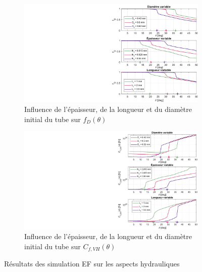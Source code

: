 \begin{figure}[!htbp]
	\begin{center}
		\begin{subfigure}[b]{0.49\textwidth}
			\captionsetup{justification=centering}
			\captionsetup{justification=centering}
			\includegraphics[trim={17cm 0cm 0cm 0cm},clip,width=\textwidth]{../Chap5/Figure/prospection_fD_L&R&thvar.pdf}
			\caption{Influence de l'épaisseur, de la longueur et du diamètre initial du tube sur $f_D(\theta)$}
			\label{fig:prospection_fD}
		\end{subfigure}
		\hfillx
		\begin{subfigure}[b]{0.49\textwidth}
			\captionsetup{justification=centering}
			\includegraphics[trim={17cm 0cm 0cm 0cm},clip,width=\textwidth]{../Chap5/Figure/prospection_Cf_L&R&thvar.pdf}
			\caption{Influence de l'épaisseur, de la longueur et du diamètre initial du tube sur $C_{f,VH}(\theta)$}
			\label{fig:prospection_Cf}
		\end{subfigure}
		\caption{Résultats des simulation EF sur les aspects hydrauliques}
		\label{fig:prospection_(fD+Cf)}
	\end{center}
\end{figure}

